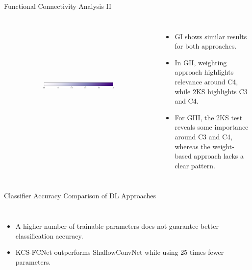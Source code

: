 \documentclass[aspectratio=169]{beamer}
\begin{document}
\begin{frame}{Functional Connectivity Analysis II}
\begin{columns}
\begin{figure}
{\begin{minipage}{\linewidth}
\begin{subfigure}[b]{.13\linewidth}
            \centering
            \resizebox{1.1\linewidth}{!}{}    
        \end{subfigure}
        ~ 
        \begin{subfigure}[b]{.13\linewidth}
            \centering
            \resizebox{1.1\linewidth}{!}{}
        \end{subfigure}
        ~ 
        \begin{subfigure}[b]{0.13\linewidth}
            \centering
            \resizebox{1.1\linewidth}{!}{}
        \end{subfigure}
        \\
        \centering
        \begin{subfigure}[b]{0.4\linewidth}
            \includegraphics[width=1\linewidth]{../Tesis_document/Figures/Objective_2/colorbar.pdf}
        \end{subfigure}
    \end{minipage}
    }
\end{figure}
\begin{itemize}
    \item GI shows similar results for both approaches.
    \item In GII, weighting approach highlights relevance around C4, while 2KS highlights C3 and C4.
    \item For GIII, the 2KS test reveals some importance around C3 and C4, whereas the weight-based approach lacks a clear pattern.
\end{itemize}
\end{columns}
\end{frame}


\begin{frame}{Classifier Accuracy Comparison of DL Approaches}
    \begin{columns}
            \begin{itemize}
                \item A higher number of trainable parameters does not guarantee better classification accuracy.
                \item KCS-FCNet outperforms ShallowConvNet while using 25 times fewer parameters.
            \end{itemize}
            \centering
            \resizebox{1\linewidth}{!}{}
    \end{columns}
\end{frame}
\end{document}
